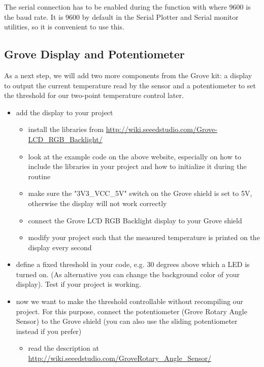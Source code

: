The serial connection has to be enabled during the  function with  where 9600 is the baud rate. It is 9600 by default in the Serial Plotter and Serial monitor utilities, so it is convenient to use this.


\subsection{Grove Display and Potentiometer}\label{sec:grovedisp}
As a next step, we will add two more components from the Grove kit: a display to output the current temperature read by the sensor and a potentiometer to set the threshold for our two-point temperature control later. 
\begin{itemize}
    \item add the display to your project
	\begin{itemize}
        \item install the libraries from \href{http://wiki.seeedstudio.com/Grove-LCD_RGB_Backlight/}{http://wiki.seeedstudio.com/Grove-LCD\_RGB\_Backlight/}
        \item look at the example code on the above website, especially on how to include the libraries in your project and how to initialize it during the  routine
        \item make sure the "3V3\_VCC\_5V" switch on the Grove shield is set to 5V, otherwise the display will not work correctly
	    \item connect the Grove LCD RGB Backlight display to your Grove shield
		\item modify your project such that the measured temperature is printed on the display every second 
	\end{itemize}
	\item define a fixed threshold in your code, e.g. 30 degrees above which a LED is turned on. (As alternative you can change the background color of your display). Test if your project is working.
	\item now we want to make the threshold controllable without recompiling our project. For this purpose, connect the potentiometer (Grove Rotary Angle Sensor) to the Grove shield (you can also use the sliding potentiometer instead if you prefer)
	\begin{itemize}
        \item read the description at \href{http://wiki.seeedstudio.com/Grove-Rotary_Angle_Sensor/}{http://wiki.seeedstudio.com/Grove\-Rotary\_Angle\_Sensor/}

\end{itemize}
\end{itemize}
